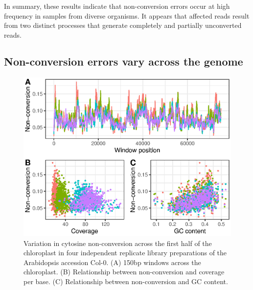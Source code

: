 \documentclass[12pt,longbibliography]{article}
\begin{document}
In summary, these results indicate that non-conversion errors occur at high frequency in samples from diverse organisms. It appears that affected reads result from two distinct processes that generate completely and partially unconverted reads.

\subsection{Non-conversion errors vary across the genome}

\begin{figure}
    \includegraphics{figure2.eps}
    \caption{
        Variation in cytosine non-conversion across the first half of the chloroplast in four independent replicate library preparations of the Arabidopsis accession Col-0.
        (A) 150bp windows across the chloroplast.
        (B) Relationship between non-conversion and coverage per base.
        (C) Relationship between non-conversion and GC content.
    }
    \label{fig:uncertainty}
\end{figure}
\end{document}
